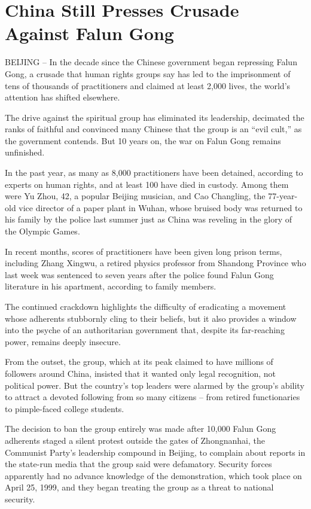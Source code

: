 \documentclass[12pt,a4paper,onecolumn]{article}
\begin{document}
\section{China Still Presses Crusade Against Falun Gong}

BEIJING -- In the decade since the Chinese government began repressing Falun Gong, a crusade that
human rights groups say has led to the imprisonment of tens of thousands of practitioners and
claimed at least 2,000 lives, the world's attention has shifted elsewhere.

The drive against the spiritual group has eliminated its leadership, decimated the ranks of faithful
and convinced many Chinese that the group is an ``evil cult,'' as the government contends. But 10
years on, the war on Falun Gong remains unfinished.

In the past year, as many as 8,000 practitioners have been detained, according to experts on human
rights, and at least 100 have died in custody. Among them were Yu Zhou, 42, a popular Beijing
musician, and Cao Changling, the 77-year-old vice director of a paper plant in Wuhan, whose bruised
body was returned to his family by the police last summer just as China was reveling in the glory of
the Olympic Games.

In recent months, scores of practitioners have been given long prison terms, including Zhang Xingwu,
a retired physics professor from Shandong Province who last week was sentenced to seven years after
the police found Falun Gong literature in his apartment, according to family members.

The continued crackdown highlights the difficulty of eradicating a movement whose adherents
stubbornly cling to their beliefs, but it also provides a window into the psyche of an authoritarian
government that, despite its far-reaching power, remains deeply insecure.

From the outset, the group, which at its peak claimed to have millions of followers around China,
insisted that it wanted only legal recognition, not political power. But the country's top leaders
were alarmed by the group's ability to attract a devoted following from so many citizens -- from
retired functionaries to pimple-faced college students.

The decision to ban the group entirely was made after 10,000 Falun Gong adherents staged a silent
protest outside the gates of Zhongnanhai, the Communist Party's leadership compound in Beijing, to
complain about reports in the state-run media that the group said were defamatory. Security forces
apparently had no advance knowledge of the demonstration, which took place on April 25, 1999, and
they began treating the group as a threat to national security.
\end{document}
